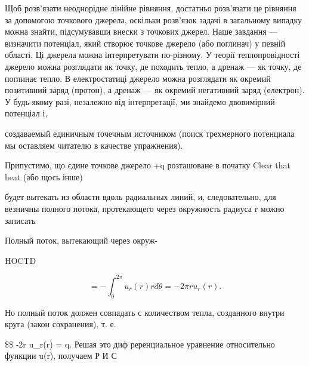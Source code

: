 \documentclass[
  ukrainian,
]{article}
\begin{document}
Щоб розв'язати неоднорідне лінійне рівняння, достатньо розв'язати це
рівняння за допомогою точкового джерела, оскільки розв'язок задачі в
загальному випадку можна знайти, підсумувавши внески з точкових джерел.
Наше завдання --- визначити потенціал, який створює точкове джерело (або
поглинач) у певній області. Ці джерела можна інтерпретувати по-різному.
У теорії теплопровідності джерело можна розглядати як точку, де походить
тепло, а дренаж --- як точку, де поглинає тепло. В електростатиці
джерело можна розглядати як окремий позитивний заряд (протон), а дренаж
--- як окремий негативний заряд (електрон). У будь-якому разі, незалежно
від інтерпретації, ми знайдемо двовимірний потенціал і,

создаваемый единичным точечным источником (поиск трехмерного потенциала
мы оставляем читателю в качестве упражнения).

Припустимо, що єдине точкове джерело +q розташоване в початку Clear that
heat (або щось інше)

будет вытекать из области вдоль радиальных линий, и, следовательно, для
везничны полного потока, протекающего через окружность радиуса r можно
записать

Полный поток, вытекающий через окруж-

HOCTD

\[
= -\int_{0}^{2\pi} u_{r}(r) r d\theta = -2\pi r u_{r}(r).
\]

Но полный поток должен совпадать с количеством тепла, созданного внутри
круга (закон сохранения), т. е.

\$\$ -2\pi r u\_r(r) = q. Решая это диф реренциальное уравнение
относительно функции u(r), получаем Р И С
\end{document}

